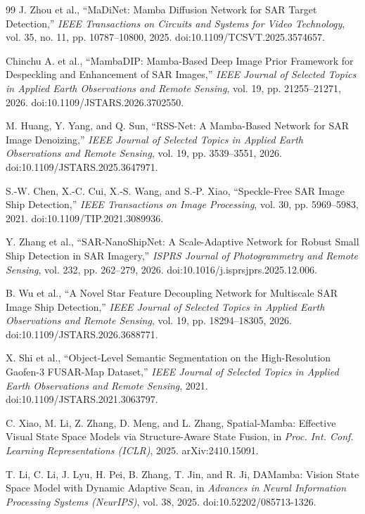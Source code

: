 \documentclass[journal]{IEEEtran}
\begin{document}
\begin{thebibliography}{99}
J. Zhou et al., ``MaDiNet: Mamba Diffusion Network for SAR Target Detection,'' \emph{IEEE Transactions on Circuits and Systems for Video Technology}, vol. 35, no. 11, pp. 10787--10800, 2025. doi:10.1109/TCSVT.2025.3574657.

Chinchu A. et al., ``MambaDIP: Mamba-Based Deep Image Prior Framework for Despeckling and Enhancement of SAR Images,'' \emph{IEEE Journal of Selected Topics in Applied Earth Observations and Remote Sensing}, vol. 19, pp. 21255--21271, 2026. doi:10.1109/JSTARS.2026.3702550.

M. Huang, Y. Yang, and Q. Sun, ``RSS-Net: A Mamba-Based Network for SAR Image Denoizing,'' \emph{IEEE Journal of Selected Topics in Applied Earth Observations and Remote Sensing}, vol. 19, pp. 3539--3551, 2026. doi:10.1109/JSTARS.2025.3647971.

S.-W. Chen, X.-C. Cui, X.-S. Wang, and S.-P. Xiao, ``Speckle-Free SAR Image Ship Detection,'' \emph{IEEE Transactions on Image Processing}, vol. 30, pp. 5969--5983, 2021. doi:10.1109/TIP.2021.3089936.

Y. Zhang et al., ``SAR-NanoShipNet: A Scale-Adaptive Network for Robust Small Ship Detection in SAR Imagery,'' \emph{ISPRS Journal of Photogrammetry and Remote Sensing}, vol. 232, pp. 262--279, 2026. doi:10.1016/j.isprsjprs.2025.12.006.

B. Wu et al., ``A Novel Star Feature Decoupling Network for Multiscale SAR Image Ship Detection,'' \emph{IEEE Journal of Selected Topics in Applied Earth Observations and Remote Sensing}, vol. 19, pp. 18294--18305, 2026. doi:10.1109/JSTARS.2026.3688771.

X. Shi et al., ``Object-Level Semantic Segmentation on the High-Resolution Gaofen-3 FUSAR-Map Dataset,'' \emph{IEEE Journal of Selected Topics in Applied Earth Observations and Remote Sensing}, 2021. doi:10.1109/JSTARS.2021.3063797.

C. Xiao, M. Li, Z. Zhang, D. Meng, and L. Zhang, Spatial-Mamba: Effective Visual State Space Models via Structure-Aware State Fusion, in \emph{Proc. Int. Conf. Learning Representations (ICLR)}, 2025. arXiv:2410.15091.

T. Li, C. Li, J. Lyu, H. Pei, B. Zhang, T. Jin, and R. Ji, DAMamba: Vision State Space Model with Dynamic Adaptive Scan, in \emph{Advances in Neural Information Processing Systems (NeurIPS)}, vol. 38, 2025. doi:10.52202/085713-1326.


\end{thebibliography}
\end{document}
